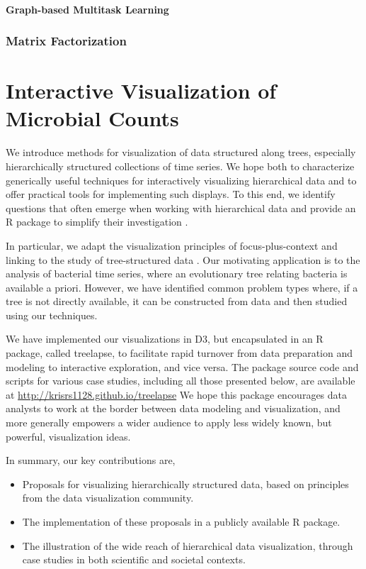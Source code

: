 \documentclass{report}
\begin{document}
\subsubsection{Graph-based Multitask Learning}

\subsection{Matrix Factorization}

\chapter{Interactive Visualization of Microbial Counts}

We introduce methods for visualization of data structured along trees,
especially hierarchically structured collections of time series. We hope both to
characterize generically useful techniques for interactively visualizing
hierarchical data and to offer practical tools for implementing such displays.
To this end, we identify questions that often emerge when working with
hierarchical data and provide an R package to simplify their investigation
\citep{ihaka1996r}.

In particular, we adapt the visualization principles of focus-plus-context and
linking to the study of tree-structured data \citep{buja1996interactive,
  becker1987brushing}. Our motivating application is to the analysis of
bacterial time series, where an evolutionary tree relating bacteria is available
a priori. However, we have identified common problem types where, if a tree is
not directly available, it can be constructed from data and then studied using
our techniques.

We have implemented our visualizations in D3, but encapsulated in an R package,
called treelapse, to facilitate rapid turnover from data preparation and
modeling to interactive exploration, and vice versa. The package source code and
scripts for various case studies, including all those presented below, are
available at
\href{http://krisrs1128.github.io/treelapse}{http://krisrs1128.github.io/treelapse}
We hope this package encourages data analysts to work at the border between data
modeling and visualization, and more generally empowers a wider audience to
apply less widely known, but powerful, visualization ideas.

In summary, our key contributions are,
\begin{itemize}
\item Proposals for visualizing hierarchically structured data, based on
  principles from the data visualization community.
\item The implementation of these proposals in a publicly available R package.
\item The illustration of the wide reach of hierarchical data visualization,
  through case studies in both scientific and societal contexts.
\end{itemize}
\end{document}
